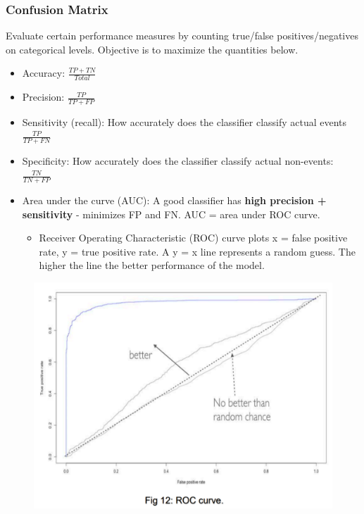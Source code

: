 \documentclass[12pt, oneside]{article}
\begin{document}
\subsubsection{Confusion Matrix}
Evaluate certain performance measures by counting true/false positives/negatives on categorical levels. Objective is to maximize the quantities below.
\begin{itemize}
    \item Accuracy: $\frac{TP + TN}{Total}$ \\
    \item Precision: $\frac{TP}{TP + FP}$ \\
    \item Sensitivity (recall): How accurately does the classifier classify actual events $\frac{TP}{TP + FN}$ \\
    \item Specificity: How accurately does the classifier classify actual non-events:
    $\frac{TN}{TN + FP}$ \\
    \item Area under the curve (AUC): A good classifier has \textbf{high precision + sensitivity} - minimizes FP and FN. AUC = area under ROC curve.
    \begin{itemize}
        \item Receiver Operating Characteristic (ROC) curve plots x = false positive rate, y = true positive rate. A y = x line represents a random guess. The higher the line the better performance of the model. 
    \end{itemize}
\end{itemize}
\begin{figure}[ht]
    \centering
     \includegraphics[width=1.0\textwidth]{ROC curve.png}
\end{figure}
\end{document}
